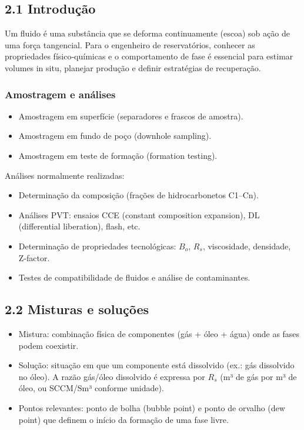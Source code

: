\documentclass[11pt,a4paper]{article}
\begin{document}
\subsection{2.1 Introdução}
Um fluido é uma substância que se deforma continuamente (escoa) sob ação de uma força tangencial. Para o engenheiro de reservatórios, conhecer as propriedades físico‑químicas e o comportamento de fase é essencial para estimar volumes in situ, planejar produção e definir estratégias de recuperação.

\subsubsection{Amostragem e análises}
\begin{itemize}
\item Amostragem em superfície (separadores e frascos de amostra).
\item Amostragem em fundo de poço (downhole sampling).
\item Amostragem em teste de formação (formation testing).
\end{itemize}

Análises normalmente realizadas:
\begin{itemize}
\item Determinação da composição (frações de hidrocarbonetos C1–Cn).
\item Análises PVT: ensaios CCE (constant composition expansion), DL (differential liberation), flash, etc.
\item Determinação de propriedades tecnológicas: $B_o$, $R_s$, viscosidade, densidade, Z‑factor.
\item Testes de compatibilidade de fluidos e análise de contaminantes.
\end{itemize}

\subsection{2.2 Misturas e soluções}
\begin{itemize}
\item Mistura: combinação física de componentes (gás + óleo + água) onde as fases podem coexistir.
\item Solução: situação em que um componente está dissolvido (ex.: gás dissolvido no óleo). A razão gás/óleo dissolvido é expressa por $R_s$ (m³ de gás por m³ de óleo, ou SCCM/Sm³ conforme unidade).
\item Pontos relevantes: ponto de bolha (bubble point) e ponto de orvalho (dew point) que definem o início da formação de uma fase livre.
\end{itemize}
\end{document}
